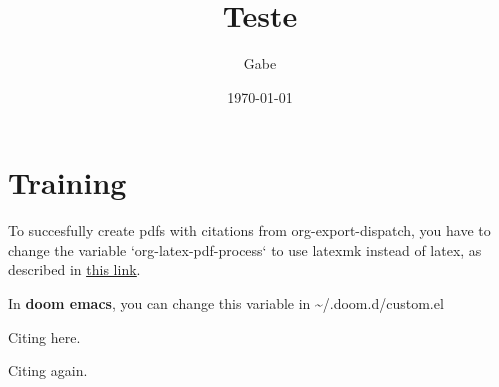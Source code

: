 \documentclass[11pt]{article}
\author{Gabe}
\date{\today}
\title{Teste}
\begin{document}
\maketitle
\tableofcontents


\section{Training}
\label{sec:orgbdfe927}

To succesfully create pdfs with citations from org-export-dispatch, you have to change the variable `org-latex-pdf-process` to use latexmk instead of latex, as described in  \href{https://github.com/jkitchin/org-ref/issues/346}{\uline{this link}}.

In \textbf{doom emacs}, you can change this variable in \textasciitilde{}/.doom.d/custom.el

Citing here. \cite{Wirthlin2018}

Citing again. \cite{Vieira2019,Valdez-Velazquez2020,Zhang2014}



\end{document}
